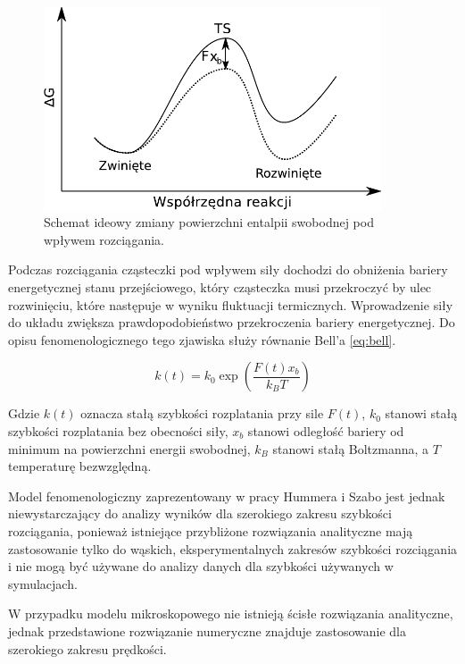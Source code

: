 \begin{figure}[h]
\begin{centering}
\includegraphics[width=100mm]{./rys/enswob.pdf}
\caption{Schemat ideowy zmiany powierzchni entalpii swobodnej pod wpływem rozciągania.}
\end{centering}
\end{figure}

Podczas rozciągania cząsteczki pod wpływem siły dochodzi do obniżenia bariery energetycznej stanu przejściowego, który cząsteczka musi przekroczyć by ulec rozwinięciu, które następuje w wyniku fluktuacji termicznych. Wprowadzenie siły do układu zwiększa prawdopodobieństwo przekroczenia bariery energetycznej. Do opisu fenomenologicznego tego zjawiska służy równanie Bell'a \ref{eq:bell}.

\begin{equation} k(t)=k_{0} \exp\left( \frac{ F(t)x_{b}}{k_{B}T}\right) \label{eq:bell}\end{equation}

Gdzie $k(t)$ oznacza stałą szybkości rozplatania przy sile $F(t)$, $k_{0}$ stanowi stałą szybkości rozplatania bez obecności siły, $x_{b}$ stanowi odległość bariery od minimum na powierzchni energii swobodnej, $k_{B}$ stanowi stałą Boltzmanna, a $T$ temperaturę bezwzględną.

Model fenomenologiczny zaprezentowany w pracy Hummera i Szabo \cite{Hummer_Szabo_2003} jest jednak niewystarczający do analizy wyników dla szerokiego zakresu szybkości rozciągania, ponieważ istniejące przybliżone rozwiązania analityczne mają zastosowanie tylko do wąskich, eksperymentalnych zakresów szybkości rozciągania i nie mogą być używane do analizy danych dla szybkości używanych w symulacjach.

W przypadku modelu mikroskopowego nie istnieją ścisłe rozwiązania analityczne, jednak przedstawione rozwiązanie numeryczne znajduje zastosowanie dla szerokiego zakresu prędkości. 

